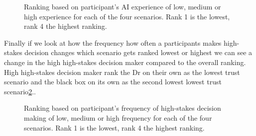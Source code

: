 \documentclass[manuscript,screen,review]{acmart}
\begin{document}
\begin{figure}[H]
    \caption{Ranking based on participant's AI experience of low, medium or high experience for each of the four scenarios. Rank 1 is the lowest, rank 4 the highest ranking.}
    \label{fig:ranking-ai}
\end{figure}

Finally if we look at how the frequency how often a participants makes high-stakes decision changes which scenario gets ranked lowest or highest we can see a change in the high high-stakes decision maker compared to the overall ranking. High high-stakes decision maker rank the Dr on their own as the lowest trust scenario and the black box on its own as the second lowest lowest trust scenario\ref{fig:ranking-highstakes-decision}..

\begin{figure}[H]
    \caption{Ranking based on participant's frequency of high-stakes decision making of low, medium or high frequency for each of the four scenarios. Rank 1 is the lowest, rank 4 the highest ranking.}
    \label{fig:ranking-highstakes-decision}
\end{figure}

\end{document}
